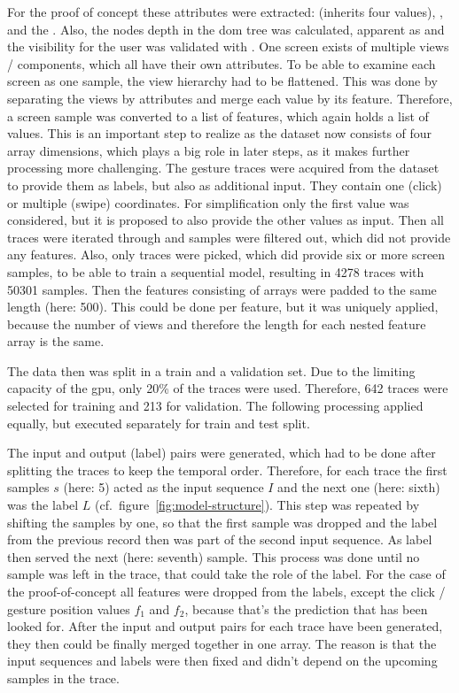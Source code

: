 For the proof of concept these attributes were extracted:  (inherits four values), ,  and the .
Also, the nodes depth in the dom tree was calculated, apparent as  and the visibility for the user was validated with .
One screen exists of multiple views / components, which all have their own attributes.
To be able to examine each screen as one sample, the view hierarchy had to be flattened.
This was done by separating the views by attributes and merge each value by its feature.
Therefore, a screen sample was converted to a list of features, which again holds a list of values.
This is an important step to realize as the dataset now consists of four array dimensions, which plays a big role in later steps, as it makes further processing more challenging.
The gesture traces were acquired from the dataset to provide them as labels, but also as additional input.
They contain one (click) or multiple (swipe) coordinates.
For simplification only the first value was considered, but it is proposed to also provide the other values as input.
Then all traces were iterated through and samples were filtered out, which did not provide any features.
Also, only traces were picked, which did provide six or more screen samples, to be able to train a sequential model, resulting in 4278 traces with 50301 samples.
Then the features consisting of arrays were padded to the same length (here: 500).
This could be done per feature, but it was uniquely applied, because the number of views and therefore the length for each nested feature array is the same.

The data then was split in a train and a validation set.
Due to the limiting capacity of the \gls{gpu}, only 20\% of the traces were used.
Therefore, 642 traces were selected for training and 213 for validation.
The following processing applied equally, but executed separately for train and test split.

The input and output (label) pairs were generated, which had to be done after splitting the traces to keep the temporal order.
Therefore, for each trace the first samples $s$ (here: 5) acted as the input sequence $I$ and the next one (here: sixth) was the label $L$ (cf.\ figure~\ref{fig:model-structure}).
This step was repeated by shifting the samples by one, so that the first sample was dropped and the label from the previous record then was part of the second input sequence.
As label then served the next (here: seventh) sample.
This process was done until no sample was left in the trace, that could take the role of the label.
For the case of the proof-of-concept all features were dropped from the labels, except the click / gesture position values $f_1$ and $f_2$, because that's the prediction that has been looked for.
After the input and output pairs for each trace have been generated, they then could be finally merged together in one array.
The reason is that the input sequences and labels were then fixed and didn't depend on the upcoming samples in the trace.

